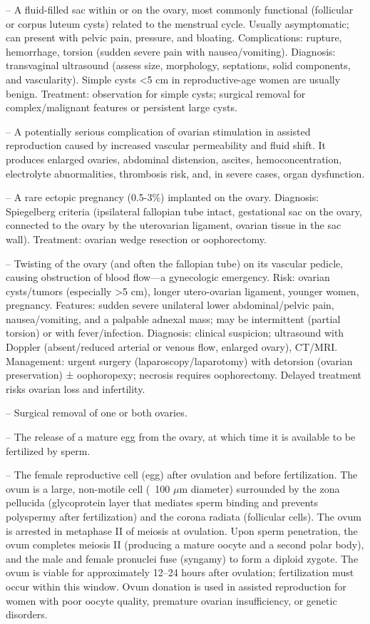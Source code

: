 -- A fluid-filled sac within or on the ovary, most commonly functional (follicular or corpus luteum cysts) related to the menstrual cycle. Usually asymptomatic; can present with pelvic pain, pressure, and bloating. Complications: rupture, hemorrhage, torsion (sudden severe pain with nausea/vomiting). Diagnosis: transvaginal ultrasound (assess size, morphology, septations, solid components, and vascularity). Simple cysts <5 cm in reproductive-age women are usually benign. Treatment: observation for simple cysts; surgical removal for complex/malignant features or persistent large cysts.

-- A potentially serious complication of ovarian stimulation in assisted reproduction caused by increased vascular permeability and fluid shift. It produces enlarged ovaries, abdominal distension, ascites, hemoconcentration, electrolyte abnormalities, thrombosis risk, and, in severe cases, organ dysfunction.

-- A rare ectopic pregnancy (0.5-3\%) implanted on the ovary. Diagnosis: Spiegelberg criteria (ipsilateral fallopian tube intact, gestational sac on the ovary, connected to the ovary by the uterovarian ligament, ovarian tissue in the sac wall). Treatment: ovarian wedge resection or oophorectomy.

-- Twisting of the ovary (and often the fallopian tube) on its vascular pedicle, causing obstruction of blood flow—a gynecologic emergency. Risk: ovarian cysts/tumors (especially >5 cm), longer utero-ovarian ligament, younger women, pregnancy. Features: sudden severe unilateral lower abdominal/pelvic pain, nausea/vomiting, and a palpable adnexal mass; may be intermittent (partial torsion) or with fever/infection. Diagnosis: clinical suspicion; ultrasound with Doppler (absent/reduced arterial or venous flow, enlarged ovary), CT/MRI. Management: urgent surgery (laparoscopy/laparotomy) with detorsion (ovarian preservation) ± oophoropexy; necrosis requires oophorectomy. Delayed treatment risks ovarian loss and infertility.

-- Surgical removal of one or both ovaries.

-- The release of a mature egg from the ovary, at which time it is available to be fertilized by sperm.

-- The female reproductive cell (egg) after ovulation and before fertilization. The ovum is a large, non-motile cell (~100 \(\mu\)m diameter) surrounded by the zona pellucida (glycoprotein layer that mediates sperm binding and prevents polyspermy after fertilization) and the corona radiata (follicular cells). The ovum is arrested in metaphase II of meiosis at ovulation. Upon sperm penetration, the ovum completes meiosis II (producing a mature oocyte and a second polar body), and the male and female pronuclei fuse (syngamy) to form a diploid zygote. The ovum is viable for approximately 12--24 hours after ovulation; fertilization must occur within this window. Ovum donation is used in assisted reproduction for women with poor oocyte quality, premature ovarian insufficiency, or genetic disorders.

